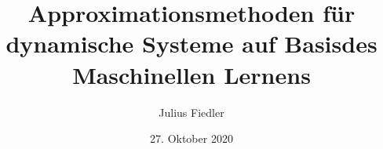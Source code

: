 \documentclass[arbeit=studie,oneside,BCOR=12mm]{ArbeitRST}
\begin{document}

\author{Julius Fiedler}



\title{Approximationsmethoden für dynamische Systeme auf Basisdes Maschinellen Lernens}




\date{27. Oktober 2020}


\pagestyle{plain}


\maketitle





\selbststaendigkeitserklaerung


\kurzfassung{}{}


\tableofcontents





\listoffigures





\end{document}
